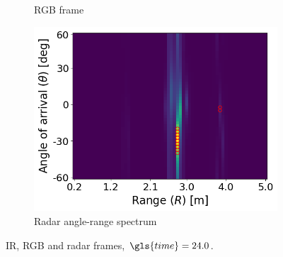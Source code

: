 \begin{figure}
\begin{subfigure}[t]{0.3\textwidth}
        \caption{RGB frame}
    \end{subfigure}
    \hfill
    \begin{subfigure}[t]{0.3\textwidth}
        \includegraphics[width=\textwidth]{fig/5/radar_t_24.0.png}
        \caption{Radar angle-range spectrum}
    \end{subfigure}
    \caption{IR, RGB and radar frames, $\gls{time} = 24.0$.}
    \label{fig:5-frames-2}
\end{figure}

